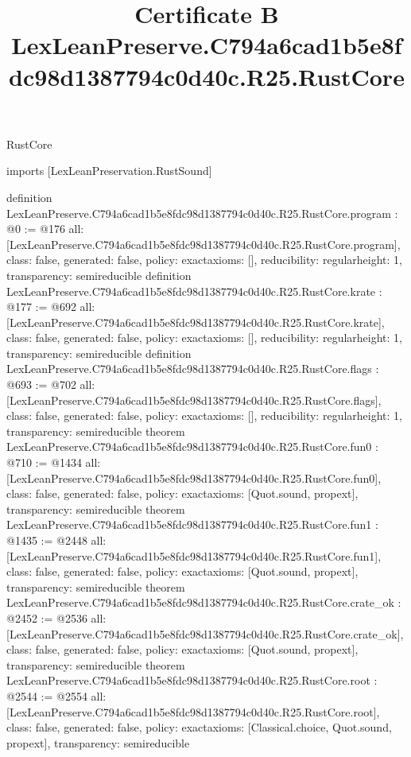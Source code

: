\begin{lexlean}{RustCore}
\title{Certificate B LexLeanPreserve.C794a6cad1b5e8fdc98d1387794c0d40c.R25.RustCore}
\begin{coremodule}
imports [LexLeanPreservation.RustSound]

definition LexLeanPreserve.C794a6cad1b5e8fdc98d1387794c0d40c.R25.RustCore.program : @0 := @176 {
  all: [LexLeanPreserve.C794a6cad1b5e8fdc98d1387794c0d40c.R25.RustCore.program],
  class: false,
  generated: false,
  policy: exact{axioms: []},
  reducibility: regular{height: 1},
  transparency: semireducible
}
definition LexLeanPreserve.C794a6cad1b5e8fdc98d1387794c0d40c.R25.RustCore.krate : @177 := @692 {
  all: [LexLeanPreserve.C794a6cad1b5e8fdc98d1387794c0d40c.R25.RustCore.krate],
  class: false,
  generated: false,
  policy: exact{axioms: []},
  reducibility: regular{height: 1},
  transparency: semireducible
}
definition LexLeanPreserve.C794a6cad1b5e8fdc98d1387794c0d40c.R25.RustCore.flags : @693 := @702 {
  all: [LexLeanPreserve.C794a6cad1b5e8fdc98d1387794c0d40c.R25.RustCore.flags],
  class: false,
  generated: false,
  policy: exact{axioms: []},
  reducibility: regular{height: 1},
  transparency: semireducible
}
theorem LexLeanPreserve.C794a6cad1b5e8fdc98d1387794c0d40c.R25.RustCore.fun0 : @710 := @1434 {
  all: [LexLeanPreserve.C794a6cad1b5e8fdc98d1387794c0d40c.R25.RustCore.fun0],
  class: false,
  generated: false,
  policy: exact{axioms: [Quot.sound, propext]},
  transparency: semireducible
}
theorem LexLeanPreserve.C794a6cad1b5e8fdc98d1387794c0d40c.R25.RustCore.fun1 : @1435 := @2448 {
  all: [LexLeanPreserve.C794a6cad1b5e8fdc98d1387794c0d40c.R25.RustCore.fun1],
  class: false,
  generated: false,
  policy: exact{axioms: [Quot.sound, propext]},
  transparency: semireducible
}
theorem LexLeanPreserve.C794a6cad1b5e8fdc98d1387794c0d40c.R25.RustCore.crate_ok : @2452 := @2536 {
  all: [LexLeanPreserve.C794a6cad1b5e8fdc98d1387794c0d40c.R25.RustCore.crate_ok],
  class: false,
  generated: false,
  policy: exact{axioms: [Quot.sound, propext]},
  transparency: semireducible
}
theorem LexLeanPreserve.C794a6cad1b5e8fdc98d1387794c0d40c.R25.RustCore.root : @2544 := @2554 {
  all: [LexLeanPreserve.C794a6cad1b5e8fdc98d1387794c0d40c.R25.RustCore.root],
  class: false,
  generated: false,
  policy: exact{axioms: [Classical.choice, Quot.sound, propext]},
  transparency: semireducible
}


\end{coremodule}
\end{lexlean}
